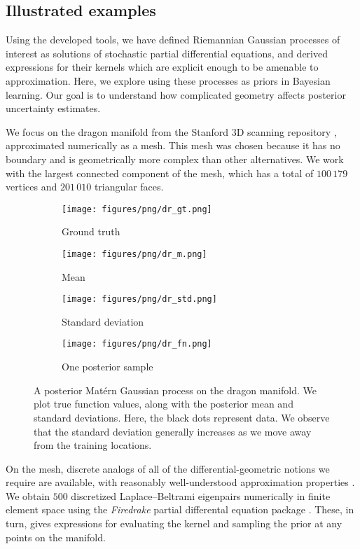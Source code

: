 \documentclass[11pt]{book}
\begin{document}
\subsection{Illustrated examples}

Using the developed tools, we have defined Riemannian Gaussian processes of interest as solutions of stochastic partial differential equations, and derived expressions for their kernels which are explicit enough to be amenable to approximation. 
Here, we explore using these processes as priors in Bayesian learning.
Our goal is to understand how complicated geometry affects posterior uncertainty estimates.

We focus on the dragon manifold from the Stanford 3D scanning repository \cite{curless96}, approximated numerically as a mesh.
This mesh was chosen because it has no boundary and is geometrically more complex than other alternatives.
We work with the largest connected component of the mesh, which has a total of $100\,179$ vertices and $201\,010$ triangular faces.

\begin{figure}
\begin{subfigure}{0.49\textwidth}
\texttt{[image: figures/png/dr\_gt.png]}
\caption{Ground truth}
\end{subfigure}
\begin{subfigure}{0.49\textwidth}
\texttt{[image: figures/png/dr\_m.png]}
\caption{Mean}
\end{subfigure}
\begin{subfigure}{0.49\textwidth}
\texttt{[image: figures/png/dr\_std.png]}
\caption{Standard deviation}
\end{subfigure}
\begin{subfigure}{0.49\textwidth}
\texttt{[image: figures/png/dr\_fn.png]}
\caption{One posterior sample}
\end{subfigure}
\caption[Posterior Gaussian process: dragon manifold]{A posterior Matérn Gaussian process on the dragon manifold. We plot true function values, along with the posterior mean and standard deviations. Here, the black dots represent data. We observe that the standard deviation generally increases as we move away from the training locations.}
\label{fig:dr-posterior}
\end{figure}

On the mesh, discrete analogs of all of the differential-geometric notions we require are available, with reasonably well-understood approximation properties \cite{crane17}.
We obtain $500$ discretized Laplace--Beltrami eigenpairs numerically in finite element space using the \emph{Firedrake} partial differental equation package \cite{rathgeber16}.
These, in turn, gives expressions for evaluating the kernel and sampling the prior at any points on the manifold.
\end{document}
